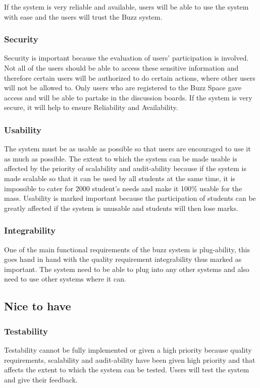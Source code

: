 If the system is very reliable and available, users will be able to use the system with ease and the users will trust the Buzz system.\\

\subsubsection{Security}
Security is important because the evaluation of users' participation is involved. Not all of the users should be able to access these sensitive information and therefore certain users will be authorized to do certain actions, where other users will not be allowed to. Only users who are registered to the Buzz Space gave access and will be able to partake in the discussion boards. If the system is very secure, it will help to ensure Reliability and Availability.\\

\subsubsection{Usability}
The system must be as usable as possible so that users are encouraged to use it as much as possible. The extent to which the system can be made usable is affected by the priority of scalability and audit-ability because if the system is made scalable so that it can be used by all students at the same time, it is impossible to cater for 2000 student's needs and make it 100\% usable for the mass. Usability is marked important because the participation of students can be greatly affected if the system is unusable and students will then lose marks.\\

\subsubsection{Integrability}
One of the main functional requirements of the buzz system is plug-ability, this goes hand in hand with the quality requirement integrability thus marked as important. The system need to be able to plug into any other systems and also need to use other systems where it can.\\

\subsection{Nice to have}

\subsubsection{Testability}
Testability cannot be fully implemented or given a high priority because quality requirements, scalability and audit-ability have been given high priority and that affects the extent to which the system can be tested. Users will test the system and give their feedback.\\

